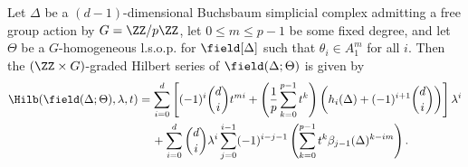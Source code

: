 \begin{theo}\label{SchenzelAnalog}
Let $\Delta$ be a $(d-1)$-dimensional Buchsbaum simplicial complex admitting a free group action by $G=\ZZ/p\ZZ$, let $0\le m\le p-1$ be some fixed degree, and let $\Theta$ be a $G$-homogeneous l.s.o.p. for $\field[\Delta]$ such that $\theta_i\in A_1^m$ for all $i$. Then the $(\ZZ\times G)$-graded Hilbert series of $\field(\Delta;\Theta)$ is given by
\begin{align*}
\Hilb(\field(\Delta; \Theta), \lambda, t)&=\sum_{i=0}^d\left[(-1)^i\binom{d}{i}t^{mi}+\left(\frac{1}{p}\sum_{k=0}^{p-1}t^k\right)\left(h_i(\Delta)+(-1)^{i+1}\binom{d}{i}\right)\right]\lambda^i\\
&\quad\,+\sum_{i=0}^d\binom{d}{i}\lambda^i\sum_{j=0}^{i-1}(-1)^{i-j-1}\left(\sum_{k=0}^{p-1}t^k\beta_{j-1}(\Delta)^{k-im} \right).
\end{align*}
\end{theo}
